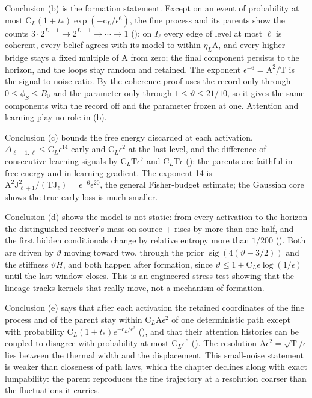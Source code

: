 Conclusion (b) is the formation statement. Except on an event of probability at most
\(\mathrm C_L(1+t_*)\exp(-\mathrm c_L/\epsilon^6)\), the fine process and its parents show the counts
\(3\cdot2^{L-1}\to2^{L-1}\to\cdots\to1\) (): on \(I_\ell\) every edge of
level at most \(\ell\) is coherent, every belief agrees with its model to within \(\eta_L\mathrm A\), and every
higher bridge stays a fixed multiple of \(\mathrm A\) from zero; the final component persists to the horizon,
and the loops stay random and retained. The exponent \(\epsilon^{-6}=\mathrm A^2/\mathrm T\) is the
signal-to-noise ratio. By  the coherence proof uses the record only through
\(0\le\phi_S\le B_0\) and the parameter only through \(1\le\vartheta\le21/10\), so it gives the same
components with the record off and the parameter frozen at one. Attention and learning play no role in (b).

Conclusion (c) bounds the free energy discarded at each activation, \(\Delta_{\ell-1:\ell}\le\mathrm C_L\epsilon^{14}\)
early and \(\mathrm C_L\epsilon^2\) at the last level, and the difference of consecutive learning signals by
\(\mathrm C_L\mathrm T\epsilon^7\) and \(\mathrm C_L\mathrm T\epsilon\) ():
the parents are faithful in free energy and in learning gradient. The exponent 14 is
\(\mathrm A^2\mathrm J_{\ell+1}^2/(\mathrm T\mathrm J_\ell)=\epsilon^{-6}\epsilon^{20}\), the general Fisher-budget
estimate; the Gaussian core shows the true early loss is much smaller.

Conclusion (d) shows the model is not static: from every activation to the horizon the distinguished
receiver's mass on source \(+\) rises by more than one half, and the first hidden conditionals change by
relative entropy more than \(1/200\) (). Both are driven by
\(\vartheta\) moving toward two, through the prior \(\operatorname{sig}(4(\vartheta-3/2))\) and the stiffness
\(\vartheta H\), and both happen after formation, since \(\vartheta\le1+\mathrm C_L\epsilon\log(1/\epsilon)\)
until the last window closes. This is an engineered stress test showing that the lineage tracks kernels
that really move, not a mechanism of formation.

Conclusion (e) says that after each activation the retained coordinates of the fine process and of the
parent stay within \(\mathrm C_L\mathrm A\epsilon^2\) of one deterministic path except with probability
\(\mathrm C_L(1+t_*)e^{-\mathrm c_L/\epsilon^2}\) (), and that
their attention histories can be coupled to disagree with probability at most \(\mathrm C_L\epsilon^6\)
(). The resolution \(\mathrm A\epsilon^2=\sqrt{\mathrm T}/\epsilon\) lies
between the thermal width and the displacement. This small-noise statement is weaker than closeness of
path laws, which the chapter declines along with exact lumpability: the parent reproduces the fine
trajectory at a resolution coarser than the fluctuations it carries.

